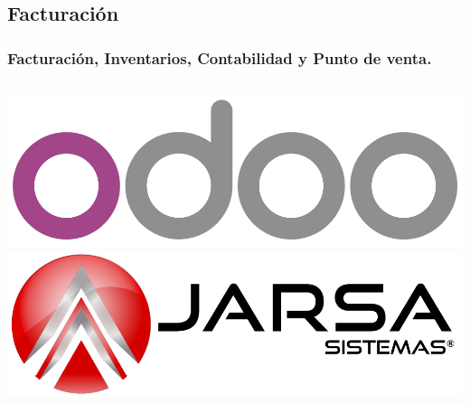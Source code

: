 \subsection{Facturación}
\begin{frame}
    \frametitle{Facturación, Inventarios, Contabilidad y Punto de venta.}
    \begin{columns}
            \includegraphics[width=\textwidth]{Logo-Odoo.png}
            \includegraphics[width=\textwidth]{Logo-Jarsa.png}
    \end{columns}
\end{frame}
